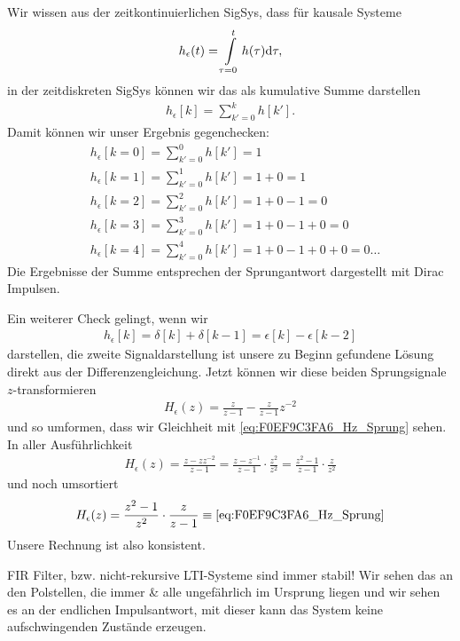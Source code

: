 \begin{Loesung}
Wir wissen aus der zeitkontinuierlichen SigSys, dass für kausale Systeme
\begin{align}
h_\epsilon(t) = \int\limits_{\tau=0}^{t} h(\tau) \mathrm{d} \tau,
\end{align}
in der zeitdiskreten SigSys können wir das als kumulative Summe darstellen
\begin{align}
h_\epsilon[k] = \sum\limits_{k'=0}^{k} h[k'].
\end{align}
%
Damit können wir unser Ergebnis gegenchecken:
%
\begin{align}
&h_\epsilon[k=0] = \sum\limits_{k'=0}^{0} h[k'] = 1\\
&h_\epsilon[k=1] = \sum\limits_{k'=0}^{1} h[k'] = 1 + 0 = 1\\
&h_\epsilon[k=2] = \sum\limits_{k'=0}^{2} h[k'] = 1 + 0 - 1 = 0\\
&h_\epsilon[k=3] = \sum\limits_{k'=0}^{3} h[k'] = 1 + 0 - 1 + 0 = 0\\
&h_\epsilon[k=4] = \sum\limits_{k'=0}^{4} h[k'] = 1 + 0 - 1 + 0 + 0 = 0\dots
\end{align}
%
Die Ergebnisse der Summe entsprechen der Sprungantwort dargestellt mit Dirac Impulsen.
%

Ein weiterer Check gelingt, wenn wir
\begin{align}
h_\epsilon[k] = \delta[k] + \delta[k-1] = \epsilon[k] - \epsilon[k-2]
\end{align}
darstellen, die zweite Signaldarstellung ist unsere zu Beginn gefundene Lösung direkt aus der Differenzengleichung.
%
Jetzt können wir diese beiden Sprungsignale $z$-transformieren
\begin{align}
H_\epsilon(z) = \frac{z}{z-1} - \frac{z}{z-1} z^{-2}
\end{align}
und so umformen, dass wir Gleichheit mit \eqref{eq:F0EF9C3FA6_Hz_Sprung} sehen.
%
In aller Ausführlichkeit
\begin{align}
H_\epsilon(z) = \frac{z- z z^{-2}}{z-1} = \frac{z- z^{-1}}{z-1} \cdot \frac{z^2}{z^2} =
\frac{z^2- 1}{z-1} \cdot \frac{z}{z^2}
\end{align}
und noch umsortiert
\begin{align}
H_\epsilon(z) = \frac{z^2- 1}{z^2} \cdot \frac{z}{z-1} \equiv \eqref{eq:F0EF9C3FA6_Hz_Sprung}
\end{align}
%
Unsere Rechnung ist also konsistent.

FIR Filter, bzw. nicht-rekursive LTI-Systeme sind immer stabil! Wir sehen das
an den Polstellen, die immer \& alle ungefährlich im Ursprung liegen und wir sehen es
an der endlichen Impulsantwort, mit dieser kann das System keine aufschwingenden
Zustände erzeugen.

\end{Loesung}
